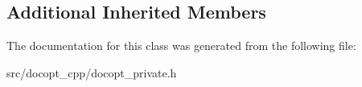 \subsection*{Additional Inherited Members}


The documentation for this class was generated from the following file\+:\begin{DoxyCompactItemize}
\item 
src/docopt\+\_\+cpp/docopt\+\_\+private.\+h\end{DoxyCompactItemize}
